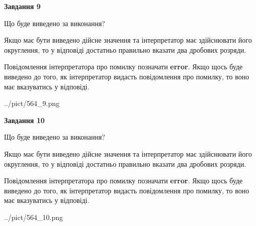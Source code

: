 \documentclass[12pt, ukrainian]{article}
\begin{document}
{\begin {Large}
{\begin {center}\textbf{Завдання 9}\end {center}}\par
Що буде виведено за виконання? \par

Якщо має бути виведено дійсне значення та інтерпретатор має здійснювати його округлення, 
то у відповіді достатньо правильно вказати два дробових розряди.

Повідомлення інтерпретатора про помилку позначати \textbf{error}.
Якщо щось буде виведено до того, як інтерпретатор видасть повідомлення про помилку, 
то воно має вказуватись у відповіді. \par

\begin{center}
	{../pict/564_9.png}
\end{center}
\newpage

{\begin {center}\textbf{Завдання 10}\end {center}}\par
Що буде виведено за виконання? \par

Якщо має бути виведено дійсне значення та інтерпретатор має здійснювати його округлення, 
то у відповіді достатньо правильно вказати два дробових розряди.

Повідомлення інтерпретатора про помилку позначати \textbf{error}.
Якщо щось буде виведено до того, як інтерпретатор видасть повідомлення про помилку, 
то воно має вказуватись у відповіді. \par

\begin{center}
	{../pict/564_10.png}
\end{center}
\newpage

\end {Large}}
\end{document}
